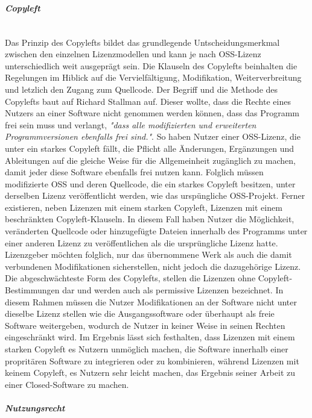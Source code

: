 \subparagraph{Copyleft} $~$

Das Prinzip des Copylefts bildet das grundlegende Untscheidungsmerkmal zwischen den einzelnen Lizenzmodellen und kann je nach OSS-Lizenz unterschiedlich weit ausgeprägt sein. Die Klauseln des Copylefts beinhalten die Regelungen im Hiblick auf die Vervielfältigung, Modifikation, Weiterverbreitung und letzlich den Zugang zum Quellcode. \cite{fsf_copyleft_2021} Der Begriff und die Methode des Copylefts baut auf Richard Stallman auf. Dieser wollte, dass die Rechte eines Nutzers an einer Software nicht genommen werden können, dass das Programm frei sein muss und verlangt, \textit{"dass alle modifizierten und erweiterten Programmversionen ebenfalls frei sind."}. \cite{fsf_copyleft_2021} So haben Nutzer einer OSS-Lizenz, die unter ein starkes Copyleft fällt, die Pflicht alle Änderungen, Ergänzungen und Ableitungen auf die gleiche Weise für die Allgemeinheit zugänglich zu machen, damit jeder diese Software ebenfalls frei nutzen kann. \cite{gerlach_praxisprobleme_2006} Folglich müssen modifizierte OSS und deren Quellcode, die ein starkes Copyleft besitzen, unter derselben Lizenz veröffentlicht werden, wie das urspüngliche OSS-Projekt. Ferner existieren, neben Lizenzen mit einem starken Copyleft, Lizenzen mit einem beschränkten Copyleft-Klauseln. In diesem Fall haben Nutzer die Möglichkeit, veränderten Quellcode oder hinzugefügte Dateien innerhalb des Programms unter einer anderen Lizenz zu veröffentlichen als die ursprüngliche Lizenz hatte. \cite[S. 11/12]{bitkom_ev_open_nodate} Lizenzgeber möchten folglich, nur das übernommene Werk als auch die damit verbundenen Modifikationen sicherstellen, nicht jedoch die dazugehörige Lizenz. Die abgeschwächteste Form des Copylefts, stellen die Lizenzen ohne Copyleft-Bestimmungen dar und werden auch als permissive Lizenzen bezeichnet. \cite[S. 17]{bitkom_ev_open_2016} In diesem Rahmen müssen die Nutzer Modifikationen an der Software nicht unter dieselbe Lizenz stellen wie die Ausgangssoftware oder überhaupt als freie Software weitergeben, wodurch de Nutzer in keiner Weise in seinen Rechten eingeschränkt wird. Im Ergebnis lässt sich festhalten, dass Lizenzen mit einem starken Copyleft es Nutzern unmöglich machen, die Software innerhalb einer propritären Software zu integrieren oder zu kombinieren, während Lizenzen mit keinem Copyleft, es Nutzern sehr leicht machen, das Ergebnis seiner Arbeit zu einer Closed-Software zu machen. \cite[S. 17]{bitkom_ev_open_2016}

\subparagraph{Nutzungsrecht} $~$

